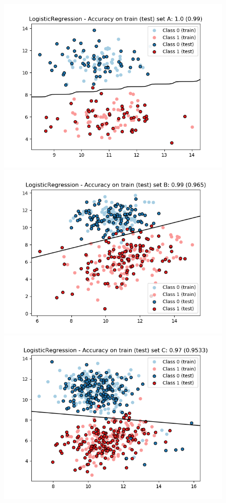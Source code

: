 \documentclass[a4paper, 11pt]{report}
\begin{document}
\begin{enumerate}[label=\alph*]
        \begin{figure}[!htb]
          \includegraphics[width=\linewidth]{./images/LogReg_A.png}
          \label{fig:logreg_a}
        \endminipage\hfill
          \includegraphics[width=\linewidth]{./images/LogReg_B.png}
          \label{fig:logreg_b}
        \endminipage\hfill
          \includegraphics[width=\linewidth]{./images/LogReg_C.png}

\end{figure}
\end{enumerate}
\end{document}
